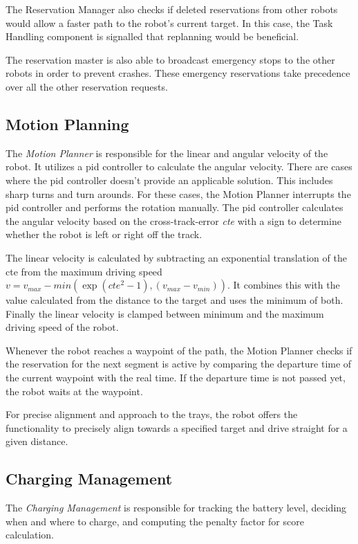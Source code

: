 \documentclass[journal]{IEEEtran}
\begin{document}
The Reservation Manager also checks if deleted reservations from other robots would allow a faster path to the robot's current target. In this case, the Task Handling component is signalled that replanning would be beneficial.

The reservation master is also able to broadcast emergency stops to the other robots in order to prevent crashes. These emergency reservations take precedence over all the other reservation requests.

\subsection{Motion Planning}
\label{subsec:motion_planning}
The \emph{Motion Planner} is responsible for the linear and angular velocity of the robot. It utilizes a pid controller to calculate the angular velocity. There are cases where the pid controller doesn't provide an applicable solution. This includes sharp turns and turn arounds. For these cases, the Motion Planner interrupts the pid controller and performs the rotation manually. The pid controller calculates the angular velocity based on the cross-track-error \emph{cte} with a sign to determine whether the robot is left or right off the track.

The linear velocity is calculated by subtracting an exponential translation of the cte from the maximum driving speed $v = v_{max} - min(\exp(cte^2-1), (v_{max}-v_{min}))$. It combines this with the value calculated from the distance to the target and uses the minimum of both. Finally the linear velocity is clamped between minimum and the maximum driving speed of the robot.

Whenever the robot reaches a waypoint of the path, the Motion Planner checks if the reservation for the next segment is active by comparing the departure time of the current waypoint with the real time. If the departure time is not passed yet, the robot waits at the waypoint.

For precise alignment and approach to the trays, the robot offers the functionality to precisely align towards a specified target and drive straight for a given distance.

\subsection{Charging Management}
\label{subsec:charging_management}
The \textit{Charging Management} is responsible for tracking the battery level, deciding when and where to charge, and computing the penalty factor for score calculation.
\end{document}
